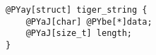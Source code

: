 \begin{Verbatim}[commandchars=@\[\]]
@PYay[struct] tiger_string {
    @PYaJ[char] @PYbe[*]data;
    @PYaJ[size_t] length;
}
\end{Verbatim}

